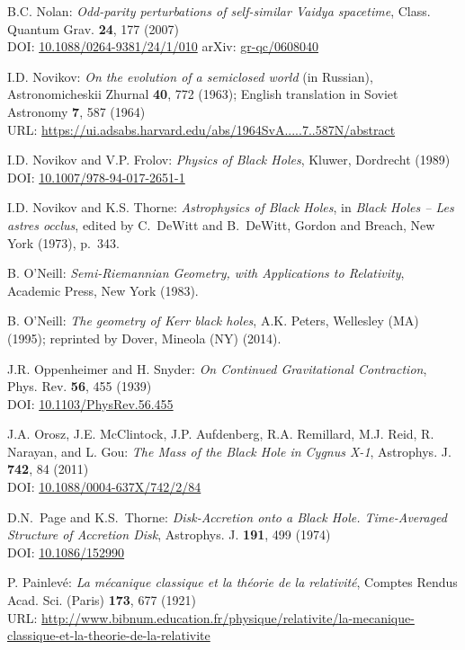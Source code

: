 \begin{thebibliography}{123}
B.C. Nolan:
{\em Odd-parity perturbations of self-similar Vaidya spacetime},
Class. Quantum Grav. {\bf 24}, 177 (2007)\\
DOI: \href{https://doi.org/10.1088/0264-9381/24/1/010}{10.1088/0264-9381/24/1/010}\hfill
arXiv: \href{https://arxiv.org/abs/gr-qc/0608040}{gr-qc/0608040}

I.D. Novikov:
{\em On the evolution of a semiclosed world} (in Russian),
Astronomicheskii Zhurnal {\bf 40}, 772 (1963); English translation in
Soviet Astronomy {\bf 7}, 587 (1964)\\
URL: \url{https://ui.adsabs.harvard.edu/abs/1964SvA.....7..587N/abstract}

I.D. Novikov and V.P. Frolov: {\em Physics of Black Holes},
Kluwer, Dordrecht (1989)\\
DOI: \href{https://doi.org/10.1007/978-94-017-2651-1}{10.1007/978-94-017-2651-1}

I.D. Novikov and K.S. Thorne: {\em Astrophysics of Black Holes},
in {\em Black Holes -- Les astres occlus},  edited by C.~DeWitt and B.~DeWitt,
Gordon and Breach, New York (1973), p.~343.

B. O'Neill: {\em Semi-Riemannian Geometry, with Applications to Relativity},
Academic Press, New York (1983).

B. O'Neill: {\em The geometry of Kerr black holes}, A.K. Peters, Wellesley (MA) (1995);
reprinted by Dover, Mineola (NY) (2014).

J.R. Oppenheimer and H. Snyder:
{\em On Continued Gravitational Contraction},
Phys. Rev. {\bf 56}, 455 (1939)\\
DOI: \href{https://doi.org/10.1103/PhysRev.56.455}{10.1103/PhysRev.56.455}

J.A. Orosz, J.E. McClintock, J.P. Aufdenberg, R.A. Remillard, M.J. Reid, R. Narayan, and L. Gou:
{\em The Mass of the Black Hole in Cygnus X-1},
Astrophys. J. {\bf 742}, 84 (2011)\\
DOI: \href{https://doi.org/10.1088/0004-637X/742/2/84}{10.1088/0004-637X/742/2/84}

D.N.~Page and K.S.~Thorne: \emph{Disk-Accretion onto a Black Hole. Time-Averaged Structure of Accretion Disk},
Astrophys. J. {\bf 191}, 499 (1974)\\
DOI: \href{https://doi.org/10.1086/152990}{10.1086/152990}

P. Painlevé: \emph{La mécanique classique et la théorie de la relativité},
Comptes Rendus Acad. Sci. (Paris) {\bf 173}, 677 (1921)\\
URL: \url{http://www.bibnum.education.fr/physique/relativite/la-mecanique-classique-et-la-theorie-de-la-relativite}


\end{thebibliography}
